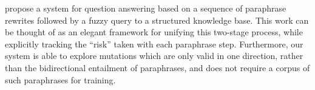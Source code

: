  propose a system for question answering
  based on a sequence of paraphrase rewrites followed by a fuzzy query to
  a structured knowledge base.
This work can be thought of as an elegant framework for unifying this
  two-stage process, while explicitly tracking the ``risk'' taken with
  each paraphrase step.
Furthermore, our system is able to explore mutations which are only
  valid in one direction, rather than the bidirectional entailment of
  paraphrases, and does not require a corpus of such paraphrases for
  training.




